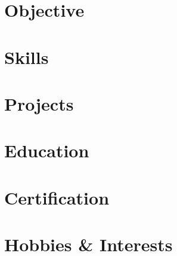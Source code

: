 \documentclass[a4paper,10pt]{article}
\begin{document}
\section{Objective}


\section{Skills}


\section{Projects}


\section{Education}


\section{Certification}


\section{Hobbies \& Interests}

\end{document}
